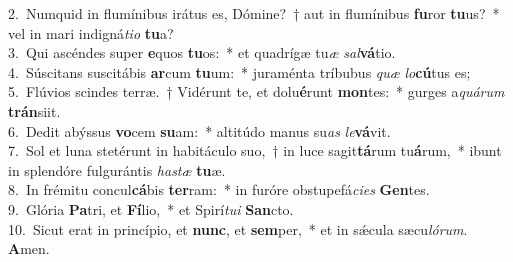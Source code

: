{2.~}Numquid in flumínibus irátus es, Dómine?~† aut in flumínibus \textbf{fu}ror \textbf{tu}us?~* vel in mari indigná\textit{ti}\textit{o} \textbf{tu}a?\\
{3.~}Qui ascéndes super \textbf{e}quos \textbf{tu}os:~* et quadrígæ tu\textit{æ} \textit{sal}\textbf{vá}tio.\\
{4.~}Súscitans suscitábis \textbf{ar}cum \textbf{tu}um:~* juraménta tríbubus \textit{quæ} \textit{lo}\textbf{cú}tus es;\\
{5.~}Flúvios scindes terræ.~† Vidérunt te, et dolu\textbf{é}runt \textbf{mon}tes:~* gurges a\textit{quá}\textit{rum} \textbf{trán}siit.\\
{6.~}Dedit abýssus \textbf{vo}cem \textbf{su}am:~* altitúdo manus su\textit{as} \textit{le}\textbf{vá}vit.\\
{7.~}Sol et luna stetérunt in habitáculo suo,~† in luce sagit\textbf{tá}rum tu\textbf{á}rum,~* ibunt in splendóre fulgurántis \textit{ha}\textit{stæ} \textbf{tu}æ.\\
{8.~}In frémitu concul\textbf{cá}bis \textbf{ter}ram:~* in furóre obstupefá\textit{ci}\textit{es} \textbf{Gen}tes.\\
{9.~}Glória \textbf{Pa}tri, et \textbf{Fí}lio,~* et Spirí\textit{tu}\textit{i} \textbf{San}cto.\\
{10.~}Sicut erat in princípio, et \textbf{nunc}, et \textbf{sem}per,~* et in sǽcula sæcu\textit{ló}\textit{rum}. \textbf{A}men.\\
